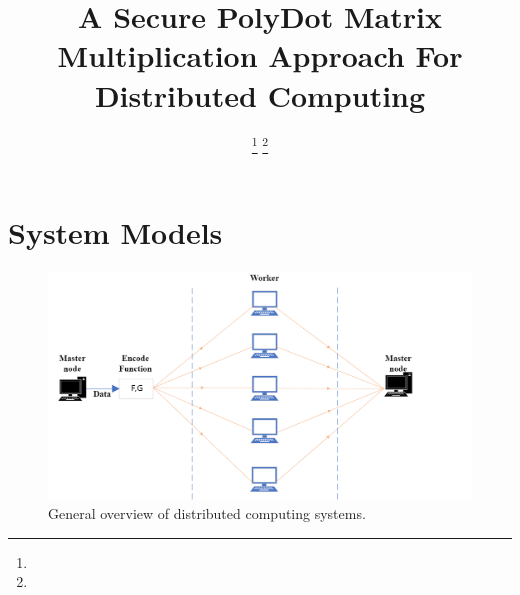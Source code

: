 \documentclass[lettersize,journal]{IEEEtran}
\begin{document}
\title{A Secure PolyDot Matrix Multiplication Approach For Distributed Computing}

\author{
\thanks{}%
\thanks{}}



\maketitle

\begin{abstract}

\end{abstract}

\begin{IEEEkeywords}

\end{IEEEkeywords}



\section{System Models}
\begin{figure}[!h]
 \centering
\includegraphics[width=0.7\linewidth]{fig/Distributed computing system.png}
    \captionsetup{justification=centering} 
 \caption{General overview of distributed computing systems.
}
  \label{Encode example}
\end{figure}
\end{document}
